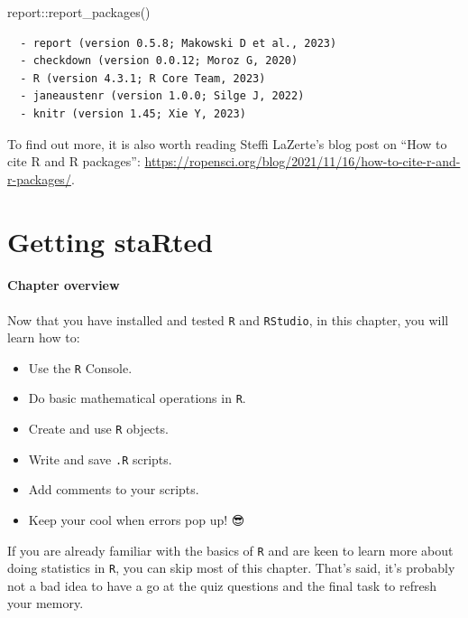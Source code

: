 \documentclass[
  letterpaper,
  DIV=11,
  numbers=noendperiod]{scrreprt}
\newenvironment{Shaded}{\begin{snugshade}}{\end{snugshade}}
\newcommand{\FunctionTok}[1]{\textcolor[rgb]{0.28,0.35,0.67}{#1}}
\newcommand{\NormalTok}[1]{\textcolor[rgb]{0.00,0.23,0.31}{#1}}
\newcommand{\SpecialCharTok}[1]{\textcolor[rgb]{0.37,0.37,0.37}{#1}}
\providecommand{\tightlist}{%
  \setlength{\itemsep}{0pt}\setlength{\parskip}{0pt}}\usepackage{longtable,booktabs,array}
\begin{document}
\begin{tcolorbox}
\begin{Shaded}
\begin{Highlighting}[]
\NormalTok{report}\SpecialCharTok{::}\FunctionTok{report\_packages}\NormalTok{()}
\end{Highlighting}
\end{Shaded}

\begin{verbatim}
  - report (version 0.5.8; Makowski D et al., 2023)
  - checkdown (version 0.0.12; Moroz G, 2020)
  - R (version 4.3.1; R Core Team, 2023)
  - janeaustenr (version 1.0.0; Silge J, 2022)
  - knitr (version 1.45; Xie Y, 2023)
\end{verbatim}

To find out more, it is also worth reading Steffi LaZerte's blog post on
``How to cite R and R packages'':
\url{https://ropensci.org/blog/2021/11/16/how-to-cite-r-and-r-packages/}.

\end{tcolorbox}


\chapter{Getting staRted}\label{getting-started}

\subsubsection*{\texorpdfstring{\textbf{Chapter
overview}}{Chapter overview}}\label{chapter-overview-1}

Now that you have installed and tested \texttt{R} and \texttt{RStudio},
in this chapter, you will learn how to:

\begin{itemize}
\tightlist
\item
  Use the \texttt{R} Console.
\item
  Do basic mathematical operations in \texttt{R}.
\item
  Create and use \texttt{R} objects.
\item
  Write and save \texttt{.R} scripts.
\item
  Add comments to your scripts.
\item
  Keep your cool when errors pop up! 😎
\end{itemize}

If you are already familiar with the basics of \texttt{R} and are keen
to learn more about doing statistics in \texttt{R}, you can skip most of
this chapter. That's said, it's probably not a bad idea to have a go at
the quiz questions and the final task to refresh your memory.
\end{document}
